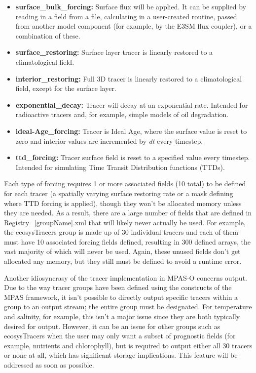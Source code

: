 \begin{itemize}
\item{{\bf{surface\_bulk\_forcing:}} Surface flux will be applied.  It can be supplied by reading in a field from a file, calculating in a user-created routine, passed from another model component (for example, by the E3SM flux coupler), or a combination of these.} 
\item{{\bf{surface\_restoring:}} Surface layer tracer is linearly restored to a climatological field.} 
\item{{\bf{interior\_restoring:}} Full 3D tracer is linearly restored to a climatological field, except for the surface layer.} 
\item{{\bf{exponential\_decay:}} Tracer will decay at an exponential rate.  Intended for radioactive tracers and, for example, simple models of oil degradation.} 
\item{{\bf{ideal-Age\_forcing:}} Tracer is Ideal Age, where the surface value is reset to zero and interior values are incremented by {\it dt} every timestep.} 
\item{{\bf{ttd\_forcing:}} Tracer surface field is reset to a specified value every timestep.  Intended for simulating Time Transit Distribution functions (TTDs).} 
\end{itemize}

Each type of forcing requires 1 or more associated fields (10 total) to be defined for each tracer (a spatially varying surface restoring rate or a mask defining where TTD forcing is applied), though they won't be allocated memory unless they are needed.  As a result, there are a large number of fields that are defined in Registry\_[groupName].xml that will likely never actually be used.  For example, the ecosysTracers group is made up of 30 individual tracers and each of them must have 10 associated forcing fields defined, resulting in 300 defined arrays, the vast majority of which will never be used.  Again, these unused fields don't get allocated any memory, but they still must be defined to avoid a runtime error.

Another idiosyncrasy of the tracer implementation in MPAS-O concerns output.  Due to the way tracer groups have been defined using the constructs of the MPAS framework, it isn't possible to directly output specific tracers within a group to an output stream; the entire group must be designated.  For temperature and salinity, for example, this isn't a major issue since they are both typically desired for output.  However, it can be an issue for other groups such as ecosysTracers when the user may only want a subset of prognostic fields (for example, nutrients and chlorophyll), but is required to output either all 30 tracers or none at all, which has significant storage implications.  This feature will be addressed as soon as possible.


